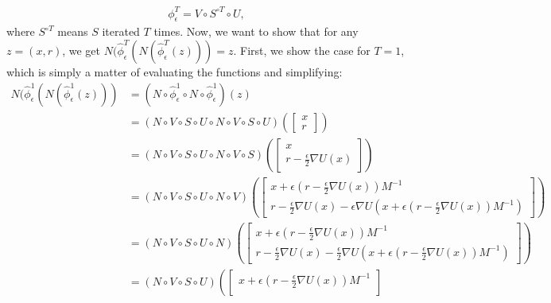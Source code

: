 \begin{align}
    \phi^T_\epsilon = V\circ S^{\circ T} \circ U,
\end{align}
where $S^{\circ T}$ means $S$ iterated $T$ times.
Now, we want to show that for any $z=(x, r)$, we get $N(\hat{\phi}^T_\epsilon(N(\hat{\phi}^T_\epsilon(z))) = z$.
First, we show the case for $T=1$, which is simply a matter of evaluating the functions and simplifying:
\begin{equation}
    \begin{aligned}
        N (\hat{\phi}^1_\epsilon(N(\hat{\phi}^1_\epsilon(z))) 
        &=
        (N \circ \hat{\phi}^1_\epsilon \circ N \circ \hat{\phi}^1_\epsilon)(z) \\
        &= (N \circ V \circ S \circ U \circ N \circ V \circ S \circ U )\left( 
        \begin{bmatrix}
            x \\ r
        \end{bmatrix}
        \right) \\
        &= (N\circ V \circ S \circ U \circ N \circ V\circ S) \left(
        \begin{bmatrix}
            x \\ r - \frac{\epsilon}{2} \nabla U(x)
        \end{bmatrix}
        \right) \\
        &= (N\circ V \circ S \circ U \circ N \circ V )\left(
        \begin{bmatrix}
            x + \epsilon (r - \frac{\epsilon}{2} \nabla U(x)) M^{-1} \\ 
            r - \frac{\epsilon}{2} \nabla U(x) - \epsilon \nabla U(x + \epsilon (r - \frac{\epsilon}{2} \nabla U(x)) M^{-1})
        \end{bmatrix}
        \right) \\
        &= (N\circ V \circ S \circ U \circ N )\left(
        \begin{bmatrix}
            x + \epsilon (r - \frac{\epsilon}{2} \nabla U(x)) M^{-1} \\ 
            r - \frac{\epsilon}{2} \nabla U(x) - \frac{\epsilon}{2} \nabla U(x + \epsilon (r - \frac{\epsilon}{2} \nabla U(x)) M^{-1})
        \end{bmatrix}
        \right) \\
        &= (N\circ V \circ S \circ U )\left(
        \begin{bmatrix}
            x + \epsilon (r - \frac{\epsilon}{2} \nabla U(x)) M^{-1} \\ 

\end{bmatrix}
\end{aligned}
\end{equation}
